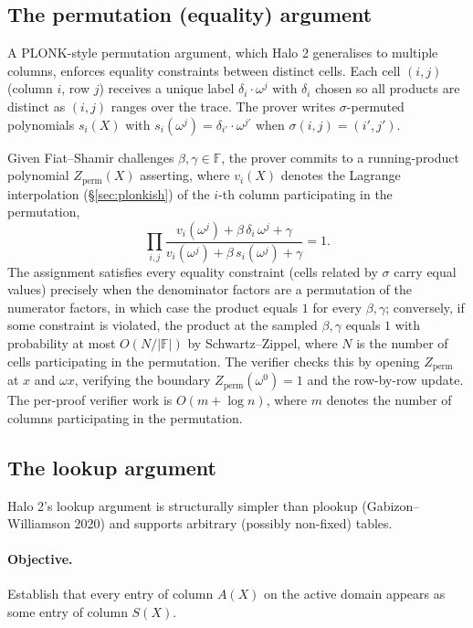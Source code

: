 \documentclass[11pt,a4paper]{article}
\theoremstyle{definition}
\newcommand{\F}{\mathbb{F}}
\begin{document}
\subsection{The permutation (equality) argument}\label{sec:perm}

A PLONK-style permutation argument, which Halo 2 generalises to multiple
columns, enforces equality constraints between distinct cells. Each
cell $(i, j)$ (column $i$, row $j$) receives a unique label
$\delta_i \cdot \omega^j$ with $\delta_i$ chosen so all products are
distinct as $(i, j)$ ranges over the trace. The prover writes
$\sigma$-permuted polynomials $s_i(X)$ with $s_i(\omega^j) =
\delta_{i'} \cdot \omega^{j'}$ when $\sigma(i, j) = (i', j')$.

Given Fiat--Shamir challenges $\beta, \gamma \in \F$, the prover commits
to a running-product polynomial $Z_{\mathrm{perm}}(X)$ asserting, where
$v_i(X)$ denotes the Lagrange interpolation (\S\ref{sec:plonkish}) of the
$i$-th column participating in the permutation,
\[
\prod_{i, j} \frac{v_i(\omega^j) + \beta\,\delta_i\,\omega^j + \gamma}
{v_i(\omega^j) + \beta\,s_i(\omega^j) + \gamma} = 1.
\]
The assignment satisfies every equality constraint (cells related by
$\sigma$ carry equal values) precisely when the denominator factors are a
permutation of the numerator factors, in which case the product equals $1$
for every $\beta, \gamma$; conversely, if some constraint is violated, the
product at the sampled $\beta, \gamma$ equals $1$ with probability at most
$O(N/|\F|)$ by Schwartz--Zippel, where $N$ is the number of cells
participating in the permutation. The verifier checks this by opening $Z_{\mathrm{perm}}$
at $x$ and $\omega x$, verifying the boundary $Z_{\mathrm{perm}}(\omega^0) = 1$
and the row-by-row update. The per-proof verifier work is $O(m + \log n)$,
where $m$ denotes the number of columns participating in the permutation.

\subsection{The lookup argument}\label{sec:lookup}

Halo 2's lookup argument is structurally simpler than plookup
(Gabizon--Williamson 2020) and supports arbitrary (possibly non-fixed)
tables.

\paragraph{Objective.} Establish that every entry of column $A(X)$ on the active
domain appears as some entry of column $S(X)$.
\end{document}
